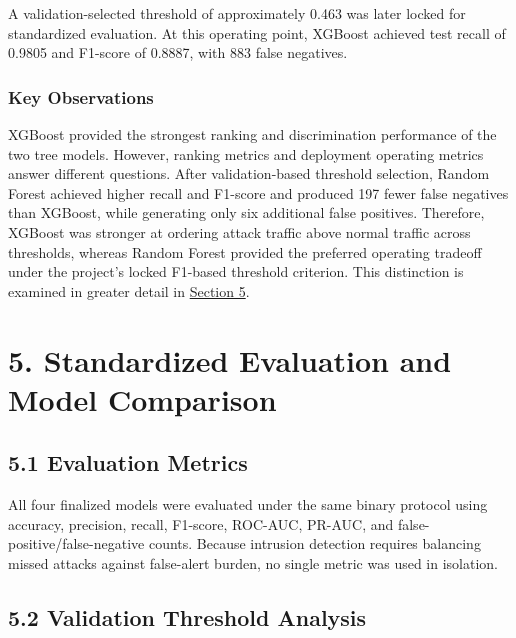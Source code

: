 \documentclass[
  canadian,
  12pt,
]{article}
\let\reportOrigSection\section
\renewcommand{\section}{\par\Needspace*{10\baselineskip}\reportOrigSection}%
\let\reportOrigSubsection\subsection
\renewcommand{\subsection}{\par\Needspace*{8\baselineskip}\reportOrigSubsection}%
\let\reportOrigSubsubsection\subsubsection
\renewcommand{\subsubsection}{\par\Needspace*{5\baselineskip}\reportOrigSubsubsection}%
\begin{document}
A validation-selected threshold of approximately 0.463 was later locked
for standardized evaluation. At this operating point, XGBoost achieved
test recall of 0.9805 and F1-score of 0.8887, with 883 false negatives.

\subsubsection{Key Observations}\label{key-observations-3}

XGBoost provided the strongest ranking and discrimination performance of
the two tree models. However, ranking metrics and deployment operating
metrics answer different questions. After validation-based threshold
selection, Random Forest achieved higher recall and F1-score and
produced 197 fewer false negatives than XGBoost, while generating only
six additional false positives. Therefore, XGBoost was stronger at
ordering attack traffic above normal traffic across thresholds, whereas
Random Forest provided the preferred operating tradeoff under the
project's locked F1-based threshold criterion. This distinction is
examined in greater detail in \hyperref[sec-5]{Section 5}.

\section[\texorpdfstring{\numberline{5.}Standardized Evaluation and Model Comparison}{5. Standardized Evaluation and Model Comparison}]{5. Standardized Evaluation and Model Comparison}\label{sec-5}

\subsection[\texorpdfstring{\numberline{5.1}Evaluation Metrics}{5.1 Evaluation Metrics}]{5.1 Evaluation Metrics}\label{sec-5-1}

All four finalized models were evaluated under the same binary protocol
using accuracy, precision, recall, F1-score, ROC-AUC, PR-AUC, and
false-positive/false-negative counts. Because intrusion detection
requires balancing missed attacks against false-alert burden, no single
metric was used in isolation.

\subsection[\texorpdfstring{\numberline{5.2}Validation Threshold Analysis}{5.2 Validation Threshold Analysis}]{5.2 Validation Threshold Analysis}\label{sec-5-2}
\end{document}
